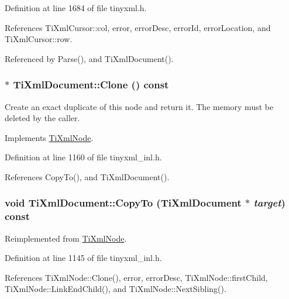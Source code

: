Definition at line 1684 of file tinyxml.h.

References TiXmlCursor::col, error, errorDesc, errorId, errorLocation, and TiXmlCursor::row.

Referenced by Parse(), and TiXmlDocument().\hypertarget{class_ti_xml_document_ac9e8f09b23454d953b32d1b65cd1409e}{
\subsubsection[{Clone}]{ $\ast$ TiXmlDocument::Clone () const}}
\label{class_ti_xml_document_ac9e8f09b23454d953b32d1b65cd1409e}
Create an exact duplicate of this node and return it. The memory must be deleted by the caller. 

Implements \hyperlink{class_ti_xml_node_a4508cc3a2d7a98e96a54cc09c37a78a4}{TiXmlNode}.

Definition at line 1160 of file tinyxml\_\-inl.h.

References CopyTo(), and TiXmlDocument().\hypertarget{class_ti_xml_document_af69deeb984e060bd00f668460dec8ef2}{
\subsubsection[{CopyTo}]{\setlength{\rightskip}{0pt plus 5cm}void TiXmlDocument::CopyTo ({\bf TiXmlDocument} $\ast$ {\em target}) const}}
\label{class_ti_xml_document_af69deeb984e060bd00f668460dec8ef2}


Reimplemented from \hyperlink{class_ti_xml_node_ab6056978923ad8350fb5164af32d8038}{TiXmlNode}.

Definition at line 1145 of file tinyxml\_\-inl.h.

References TiXmlNode::Clone(), error, errorDesc, TiXmlNode::firstChild, TiXmlNode::LinkEndChild(), and TiXmlNode::NextSibling().

